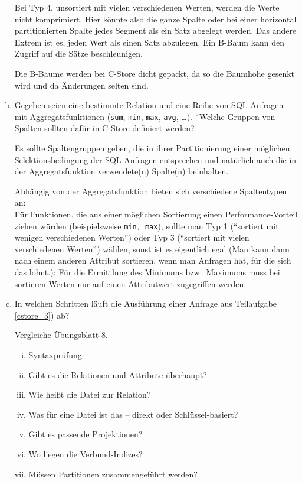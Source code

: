 \begin{enumerate}[a)]
\begin{solution}
	Bei Typ 4, unsortiert mit vielen verschiedenen Werten, werden die Werte nicht komprimiert.
	Hier könnte also die ganze Spalte oder bei einer horizontal partitionierten Spalte jedes Segment als ein Satz abgelegt werden.
	Das andere Extrem ist es, jeden Wert als einen Satz abzulegen. Ein B-Baum kann den Zugriff auf die Sätze beschleunigen.

	Die B-Bäume werden bei C-Store dicht gepackt, da so die Baumhöhe gesenkt wird und da Änderungen selten sind.
	\end{solution}

	\item \label{cstore_3} Gegeben seien eine bestimmte Relation und eine Reihe von SQL-Anfragen mit Aggregatsfunktionen (\texttt{sum}, \texttt{min}, \texttt{max}, \texttt{avg}, \ldots ).
	´Welche Gruppen von Spalten sollten dafür in C-Store definiert werden?

	\begin{solution}
	Es sollte Spaltengruppen geben, die in ihrer Partitionierung einer möglichen Selektionsbedingung der SQL-Anfragen entsprechen und natürlich auch die in der Aggregatsfunktion verwendete(n) Spalte(n) beinhalten.

	Abhängig von der Aggregatsfunktion bieten sich verschiedene Spaltentypen an: \\
	Für Funktionen, die aus einer möglichen Sortierung einen Performance-Vorteil ziehen würden (beispielsweise \texttt{min, max}), sollte man Typ 1 ("`sortiert mit wenigen verschiedenen Werten"') oder Typ 3 ("`sortiert mit vielen verschiedenen Werten"') wählen, sonst ist es eigentlich egal (Man kann dann nach einem anderen Attribut sortieren, wenn man Anfragen hat, für die sich das lohnt.): Für die Ermittlung des Minimums bzw.\ Maximums muss bei sortieren Werten nur auf einen Attributwert zugegriffen werden.
	\end{solution}

	\item In welchen Schritten läuft die Ausführung einer Anfrage aus Teilaufgabe \ref{cstore_3}) ab?

	\begin{solution}
	Vergleiche Übungsblatt 8.
	\begin{enumerate}[i)]
		\item Syntaxprüfung
		\item Gibt es die Relationen und Attribute überhaupt?
		\item Wie heißt die Datei zur Relation?
		\item Was für eine Datei ist das -- direkt oder Schlüssel-basiert?
		\item Gibt es passende Projektionen?
		\item Wo liegen die Verbund-Indizes?
		\item Müssen Partitionen zusammengeführt werden?
	\end{enumerate}
	\end{solution}
\end{enumerate}

